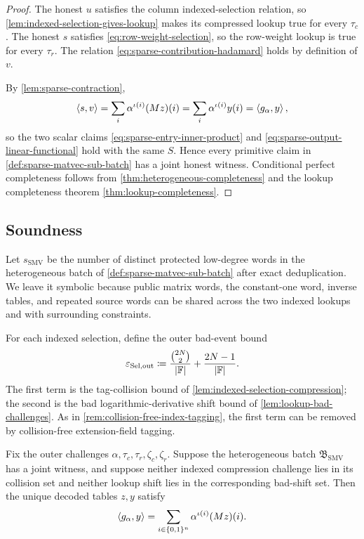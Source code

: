 \begin{proof}
The honest $u$ satisfies the column indexed-selection relation, so \cref{lem:indexed-selection-gives-lookup} makes its compressed lookup true for every $\tau_c$.  The honest $s$ satisfies \eqref{eq:row-weight-selection}, so the row-weight lookup is true for every $\tau_r$.  The relation \eqref{eq:sparse-contribution-hadamard} holds by definition of $v$.

By \cref{lem:sparse-contraction},
\[
  \left\langle s,v\right\rangle
  =\sum_i\alpha^{\iota(i)}(Mz)(i)
  =\sum_i\alpha^{\iota(i)}y(i)
  =\left\langle g_\alpha,y\right\rangle,
\]
so the two scalar claims \eqref{eq:sparse-entry-inner-product} and \eqref{eq:sparse-output-linear-functional} hold with the same $S$.  Hence every primitive claim in \cref{def:sparse-matvec-sub-batch} has a joint honest witness.  Conditional perfect completeness follows from \cref{thm:heterogeneous-completeness} and the lookup completeness theorem \cref{thm:lookup-completeness}.
\end{proof}

\subsection{Soundness}
\label{sec:sparse-matvec-soundness}

Let $s_{\mathrm{SMV}}$ be the number of distinct protected low-degree words in the heterogeneous batch of \cref{def:sparse-matvec-sub-batch} after exact deduplication.  We leave it symbolic because public matrix words, the constant-one word, inverse tables, and repeated source words can be shared across the two indexed lookups and with surrounding constraints.

For each indexed selection, define the outer bad-event bound
\begin{equation}
  \varepsilon_{\mathrm{Sel,out}}
  \coloneqq
  \frac{\binom{2N}{2}}{|\mathbb{F}|}
  +\frac{2N-1}{|\mathbb{F}|}.
  \label{eq:indexed-selection-outer-error}
\end{equation}
The first term is the tag-collision bound of \cref{lem:indexed-selection-compression}; the second is the bad logarithmic-derivative shift bound of \cref{lem:lookup-bad-challenges}.  As in \cref{rem:collision-free-index-tagging}, the first term can be removed by collision-free extension-field tagging.

\begin{lemma}
\label{lem:sparse-joint-witness}
Fix the outer challenges $\alpha,\tau_c,\tau_r,\zeta_c,\zeta_r$.  Suppose the heterogeneous batch $\mathfrak B_{\mathrm{SMV}}$ has a joint witness, and suppose neither indexed compression challenge lies in its collision set and neither lookup shift lies in the corresponding bad-shift set.  Then the unique decoded tables $z,y$ satisfy
\begin{equation}
  \left\langle g_\alpha,y\right\rangle
  =
  \sum_{i\in\{0,1\}^n}\alpha^{\iota(i)}(Mz)(i).
  \label{eq:sparse-joint-compressed-equality}
\end{equation}
\end{lemma}

